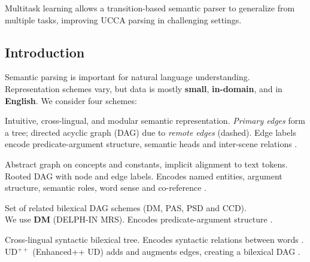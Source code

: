 \documentclass[a0,portrait]{a0poster}
\begin{document}
\vspace{1cm}
\titlespacing*{\section}{0pt}{8mm}{5mm}


\begin{adjustbox}{margin=3mm,frame,minipage=.6\linewidth,center}
\Large\color{Navy}
Multitask learning allows a transition-based semantic parser
to generalize from multiple tasks,
improving UCCA parsing in challenging settings.
\end{adjustbox}


\begin{multicols}{2}


\color{Black}

\section*{Introduction}

Semantic parsing is important for natural language understanding.
Representation schemes vary,
but data is mostly \textbf{small}, \textbf{in-domain}, and in \textbf{English}.
We consider four schemes:
\begin{description}[nosep,labelsep=1em]
\item[\color{violet} UCCA.] Intuitive, cross-lingual, and modular semantic representation.
    \textit{Primary edges} form a tree; directed acyclic graph (DAG) due to \textit{remote edges} (dashed).
    Edge labels encode predicate-argument structure, semantic heads and inter-scene relations
    \cite{abend2013universal}.
\item[\color{teal} AMR.] Abstract graph on concepts and constants, implicit alignment to text tokens.
    Rooted DAG with node and edge labels.
    Encodes named entities, argument structure, semantic roles, word sense and co-reference
    \cite{banarescu2013abstract}.
\item[\color{blue} SDP.] Set of related bilexical DAG schemes (DM, PAS, PSD and CCD). \\
    We use \textbf{\color{blue} DM} (DELPH-IN MRS).
    Encodes predicate-argument structure \cite{oepen2016towards}.
\item[\color{purple} UD.] Cross-lingual syntactic bilexical tree.
    Encodes syntactic relations between words \cite{nivre2016universal}. \\
    UD$^{++}$ (Enhanced++ UD) adds and augments edges, creating a bilexical DAG \cite{SCHUSTER16.779}.
\end{description}


\end{multicols}
\end{document}
